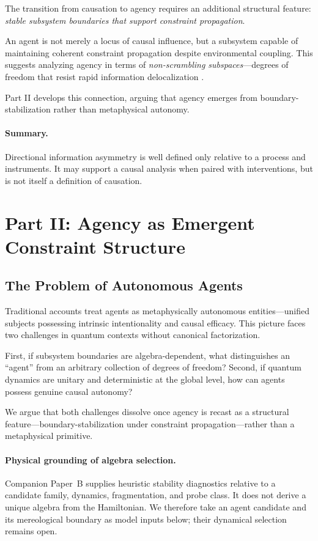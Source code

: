 \documentclass[11pt,a4paper]{article}
\begin{document}
The transition from causation to agency requires an additional structural feature: \emph{stable subsystem boundaries that support constraint propagation}.

An agent is not merely a locus of causal influence, but a subsystem capable of maintaining coherent constraint propagation despite environmental coupling. This suggests analyzing agency in terms of \emph{non-scrambling subspaces}—degrees of freedom that resist rapid information delocalization \cite{Hayden2007}.

Part II develops this connection, arguing that agency emerges from boundary-stabilization rather than metaphysical autonomy.

\paragraph{Summary.} Directional information asymmetry is well defined only relative to a process and instruments.  It may support a causal analysis when paired with interventions, but is not itself a definition of causation.

\section{Part II: Agency as Emergent Constraint Structure}
\label{sec:agency}

\subsection{The Problem of Autonomous Agents}
\label{sec:II.1}

Traditional accounts treat agents as metaphysically autonomous entities—unified subjects possessing intrinsic intentionality and causal efficacy. This picture faces two challenges in quantum contexts without canonical factorization.

First, if subsystem boundaries are algebra-dependent, what distinguishes an ``agent'' from an arbitrary collection of degrees of freedom? Second, if quantum dynamics are unitary and deterministic at the global level, how can agents possess genuine causal autonomy?

We argue that both challenges dissolve once agency is recast as a structural feature---boundary-stabilization under constraint propagation---rather than a metaphysical primitive.

\paragraph{Physical grounding of algebra selection.}
Companion Paper~B \cite{Liu2026PaperB} supplies heuristic stability diagnostics relative to a candidate family, dynamics, fragmentation, and probe class.  It does not derive a unique algebra from the Hamiltonian.  We therefore take an agent candidate and its mereological boundary as model inputs below; their dynamical selection remains open.
\end{document}
